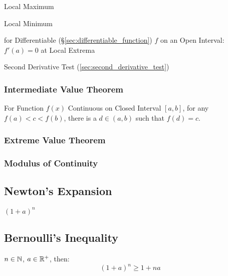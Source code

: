 Local Maximum

Local Minimum

for Differentiable (\S\ref{sec:differentiable_function}) $f$ on an
Open Interval: $f'(a) = 0$ at Local Extrema

\fist Second Derivative Test (\ref{sec:second_derivative_test})



\subsubsection{Intermediate Value Theorem}
\label{sec:intermediate_value}

For Function $f(x)$ Continuous on Closed Interval $[a,b]$, for any
$f(a) < c < f(b)$, there is a $d \in (a,b)$ such that $f(d) = c$.



\subsubsection{Extreme Value Theorem}\label{sec:extreme_value}

\subsubsection{Modulus of Continuity}\label{sec:continuity_modulus}



\subsection{Newton's Expansion}\label{sec:newtons_expansion}


$(1 + a)^n$ %



\subsection{Bernoulli's Inequality}\label{sec:bernoullis_inequality}

$n \in \mathbb{N}$, $a \in \mathbb{R}^+$, then:
\[
  (1 + a)^n \geq 1 + n a
\]


